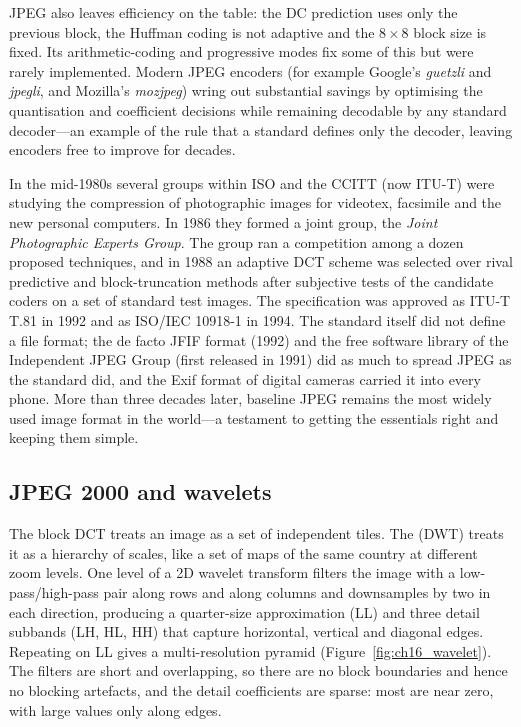 JPEG also leaves efficiency on the table: the DC prediction uses only the previous block, the Huffman
coding is not adaptive and the $8\times8$ block size is fixed. Its arithmetic-coding and progressive
modes fix some of this but were rarely implemented. Modern JPEG encoders (for example Google's
\emph{guetzli} and \emph{jpegli}, and Mozilla's \emph{mozjpeg}) wring out substantial savings by
optimising the quantisation and coefficient decisions while remaining decodable by any standard
decoder---an example of the rule that a standard defines only the decoder, leaving encoders free to
improve for decades.


\begin{history}
In the mid-1980s several groups within ISO and the CCITT (now ITU-T) were studying the compression of
photographic images for videotex, facsimile and the new personal computers. In 1986 they formed a
joint group, the \emph{Joint Photographic Experts Group}. The group ran a competition among a dozen
proposed techniques, and in 1988 an adaptive DCT scheme was selected over rival predictive and
block-truncation methods after subjective tests of the candidate coders on a set of standard test
images. The specification was approved as ITU-T T.81 in 1992 and as ISO/IEC 10918-1 in 1994. The
standard itself did not define a file format; the de facto JFIF format (1992) and the free software
library of the Independent JPEG Group (first released in 1991) did as much to spread JPEG as the
standard did, and the Exif format of digital cameras carried it into every phone. More than three
decades later, baseline JPEG remains the most widely used image format in the world---a testament to
getting the essentials right and keeping them simple.
\end{history}

\subsection{JPEG 2000 and wavelets}

The block DCT treats an image as a set of independent tiles. The 
(DWT) treats it as a hierarchy of scales, like a set of maps of the same country at different zoom
levels. One level of a 2D wavelet transform filters the image with a low-pass/high-pass pair along
rows and along columns and downsamples by two in each direction, producing a quarter-size
approximation (LL) and three detail subbands (LH, HL, HH) that capture horizontal, vertical and
diagonal edges. Repeating on LL gives a multi-resolution pyramid (Figure~\ref{fig:ch16_wavelet}).
The filters are short and overlapping, so there are no block boundaries and hence no blocking
artefacts, and the detail coefficients are sparse: most are near zero, with large values only along
edges.


